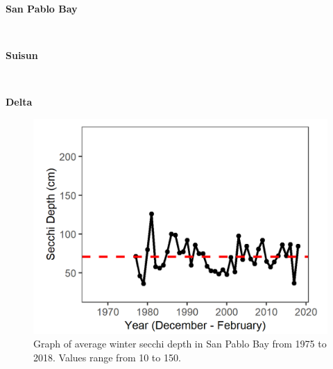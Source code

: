 \documentclass[
]{book}
\begin{document}
\begin{panel-grid}

\begin{columns-nocenter}

\begin{column800}

\textbf{San Pablo Bay}

\end{column800}

\begin{column40}

~

\end{column40}

\begin{column800}

\textbf{Suisun}

\end{column800}

\begin{column40}

~

\end{column40}

\begin{column800}

\textbf{Delta}

\end{column800}

\end{columns-nocenter}

\begin{columns-nocenter}

\begin{column800}

\begin{expand}

\begin{figure}
\includegraphics[width=15.25in]{figures/secchi_splwinter} \caption{Graph of average winter secchi depth in San Pablo Bay from 1975 to 2018. Values range from 10 to 150.}\label{fig:unnamed-chunk-146}
\end{figure}


\end{expand}
\end{column800}
\end{columns-nocenter}
\end{panel-grid}
\end{document}
